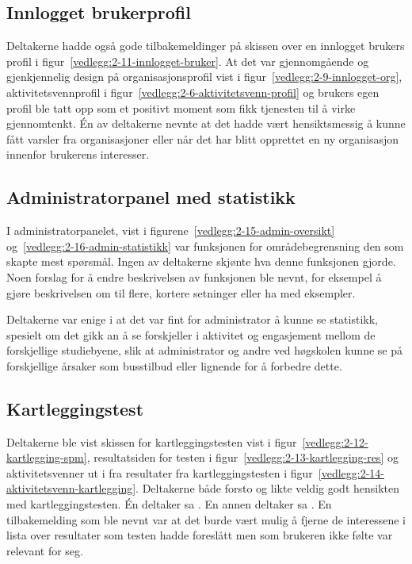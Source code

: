 \subsection{Innlogget brukerprofil}

Deltakerne hadde også gode tilbakemeldinger på skissen over en innlogget brukers profil i figur~\ref{vedlegg:2-11-innlogget-bruker}. At det var gjennomgående og gjenkjennelig design på organisasjonsprofil vist i figur~\ref{vedlegg:2-9-innlogget-org}, aktivitetsvennprofil i figur~\ref{vedlegg:2-6-aktivitetsvenn-profil} og brukers egen profil ble tatt opp som et positivt moment som fikk tjenesten til å virke gjennomtenkt. Én av deltakerne nevnte at det hadde vært hensiktsmessig å kunne fått varsler fra organisasjoner eller når det har blitt opprettet en ny organisasjon innenfor brukerens interesser.


\subsection{Administratorpanel med statistikk}

I administratorpanelet, vist i figurene~\ref{vedlegg:2-15-admin-oversikt} og~\ref{vedlegg:2-16-admin-statistikk} var funksjonen for områdebegrensning den som skapte mest spørsmål. Ingen av deltakerne skjønte hva denne funksjonen gjorde. Noen forslag for å endre beskrivelsen av funksjonen ble nevnt, for eksempel å gjøre beskrivelsen om til flere, kortere setninger eller ha med eksempler.

Deltakerne var enige i at det var fint for administrator å kunne se statistikk, spesielt om det gikk an å se forskjeller i aktivitet og engasjement mellom de forskjellige studiebyene, slik at administrator og andre ved høgskolen kunne se på forskjellige årsaker som busstilbud eller lignende for å forbedre dette.


\subsection{Kartleggingstest}

Deltakerne ble vist skissen for kartleggingstesten vist i figur~\ref{vedlegg:2-12-kartlegging-spm}, resultatsiden for testen i figur~\ref{vedlegg:2-13-kartlegging-res} og aktivitetsvenner ut i fra resultater fra kartleggingstesten i figur~\ref{vedlegg:2-14-aktivitetsvenn-kartlegging}. Deltakerne både forsto og likte veldig godt hensikten med kartleggingstesten. Én deltaker sa . En annen deltaker sa . En tilbakemelding som ble nevnt var at det burde vært mulig å fjerne de interessene i lista over resultater som testen hadde foreslått men som brukeren ikke følte var relevant for seg.


